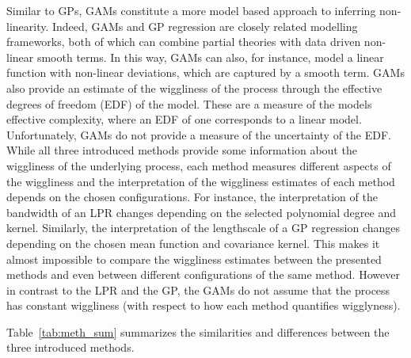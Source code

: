 \documentclass[man, floatsintext]{apa7}
\begin{document}
Similar to GPs, GAMs constitute a more model based approach to inferring
non-linearity. Indeed, GAMs and GP regression are closely related modelling
frameworks, both of which can combine partial theories with data driven
non-linear smooth terms. In this way, GAMs can also, for instance, model a
linear function with non-linear deviations, which are captured by a smooth
term. GAMs also provide an estimate of the wiggliness of the process through
the effective degrees of freedom (EDF) of the model. These are a measure of the
models effective complexity, where an EDF of one corresponds to a linear model.
Unfortunately, GAMs do not provide a measure of the uncertainty of the EDF\@.
While all three introduced methods provide some information about the
wiggliness of the underlying process, each method measures different aspects of
the wiggliness and the interpretation of the wiggliness estimates of each
method depends on the chosen configurations. For instance, the interpretation
of the bandwidth of an LPR changes depending on the selected polynomial degree
and kernel. Similarly, the interpretation of the lengthscale of a GP regression
changes depending on the chosen mean function and covariance kernel. This makes
it almost impossible to compare the wiggliness estimates between the presented
methods and even between different configurations of the same method. However
in contrast to the LPR and the GP, the GAMs do not assume that the process has
constant wiggliness (with respect to how each method quantifies wigglyness).

Table~\ref{tab:meth_sum} summarizes the similarities and differences between
the three introduced methods.
\end{document}
